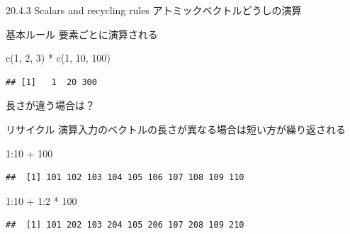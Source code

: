\documentclass[
  ignorenonframetext,
]{beamer}
\newenvironment{Shaded}{\begin{snugshade}}{\end{snugshade}}
\newcommand{\DecValTok}[1]{\textcolor[rgb]{0.00,0.00,0.81}{#1}}
\newcommand{\FunctionTok}[1]{\textcolor[rgb]{0.00,0.00,0.00}{#1}}
\newcommand{\NormalTok}[1]{#1}
\newcommand{\SpecialCharTok}[1]{\textcolor[rgb]{0.00,0.00,0.00}{#1}}
\begin{document}
\begin{frame}{20.4.3 Scalars and recycling rules}
\protect\hypertarget{scalars-and-recycling-rules}{}
アトミックベクトルどうしの演算
\end{frame}

\begin{frame}[fragile]{基本ルール}
\protect\hypertarget{ux57faux672cux30ebux30fcux30eb}{}
要素ごとに演算される

\begin{Shaded}
\begin{Highlighting}[]
\FunctionTok{c}\NormalTok{(}\DecValTok{1}\NormalTok{, }\DecValTok{2}\NormalTok{, }\DecValTok{3}\NormalTok{) }\SpecialCharTok{*} \FunctionTok{c}\NormalTok{(}\DecValTok{1}\NormalTok{, }\DecValTok{10}\NormalTok{, }\DecValTok{100}\NormalTok{)}
\end{Highlighting}
\end{Shaded}

\begin{verbatim}
## [1]   1  20 300
\end{verbatim}

長さが違う場合は？
\end{frame}

\begin{frame}[fragile]{リサイクル}
\protect\hypertarget{ux30eaux30b5ux30a4ux30afux30eb}{}
演算入力のベクトルの長さが異なる場合は短い方が繰り返される

\begin{Shaded}
\begin{Highlighting}[]
\DecValTok{1}\SpecialCharTok{:}\DecValTok{10} \SpecialCharTok{+} \DecValTok{100}
\end{Highlighting}
\end{Shaded}

\begin{verbatim}
##  [1] 101 102 103 104 105 106 107 108 109 110
\end{verbatim}

\begin{Shaded}
\begin{Highlighting}[]
\DecValTok{1}\SpecialCharTok{:}\DecValTok{10} \SpecialCharTok{+} \DecValTok{1}\SpecialCharTok{:}\DecValTok{2} \SpecialCharTok{*} \DecValTok{100}
\end{Highlighting}
\end{Shaded}

\begin{verbatim}
##  [1] 101 202 103 204 105 206 107 208 109 210
\end{verbatim}
\end{frame}
\end{document}
